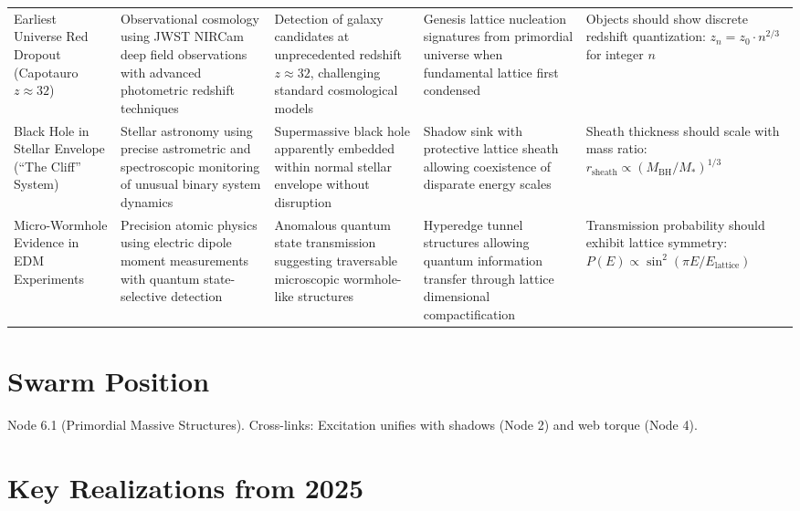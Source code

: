 \documentclass[11pt,a4paper]{article}
\begin{document}
\begin{landscape}
\begin{longtable}{p{3.5cm} p{4cm} p{5cm} p{4.5cm} p{4cm}}
Earliest Universe Red Dropout (Capotauro $z \approx 32$) & Observational cosmology using JWST NIRCam deep field observations with advanced photometric redshift techniques & Detection of galaxy candidates at unprecedented redshift $z \approx 32$, challenging standard cosmological models & Genesis lattice nucleation signatures from primordial universe when fundamental lattice first condensed & Objects should show discrete redshift quantization: $z_n = z_0 \cdot n^{2/3}$ for integer $n$ \\

Black Hole in Stellar Envelope (``The Cliff'' System) & Stellar astronomy using precise astrometric and spectroscopic monitoring of unusual binary system dynamics & Supermassive black hole apparently embedded within normal stellar envelope without disruption & Shadow sink with protective lattice sheath allowing coexistence of disparate energy scales & Sheath thickness should scale with mass ratio: $r_{\mathrm{sheath}} \propto (M_{\mathrm{BH}}/M_*)^{1/3}$ \\

Micro-Wormhole Evidence in EDM Experiments & Precision atomic physics using electric dipole moment measurements with quantum state-selective detection & Anomalous quantum state transmission suggesting traversable microscopic wormhole-like structures & Hyperedge tunnel structures allowing quantum information transfer through lattice dimensional compactification & Transmission probability should exhibit lattice symmetry: $P(E) \propto \sin^2(\pi E/E_{\mathrm{lattice}})$ \\

\end{longtable}
\end{landscape}

\section{Swarm Position}
Node 6.1 (Primordial Massive Structures). Cross-links: Excitation unifies with shadows (Node 2) and web torque (Node 4).


\section{Key Realizations from 2025}
\end{document}

